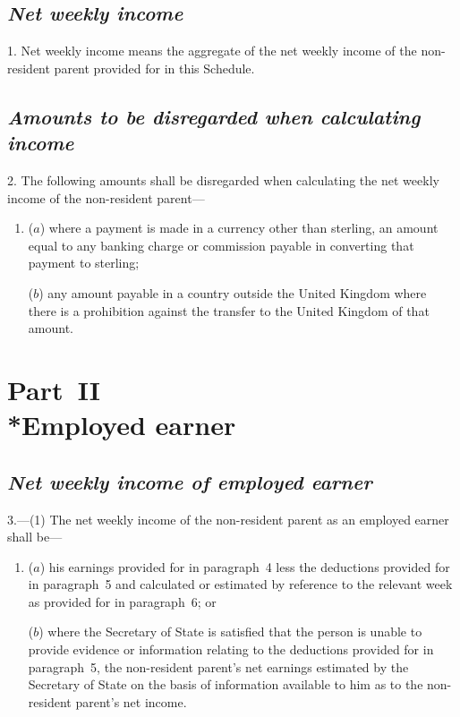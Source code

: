 \documentclass[12pt,a4paper]{article}
\begin{document}
\renewcommand\parthead{--- Schedule~Part~I}

\subsection*{\itshape Net weekly income}

1.  Net weekly income means the aggregate of the net weekly income of the non-resident parent provided for in this Schedule.

\subsection*{\itshape Amounts to be disregarded when calculating income}

2.  The following amounts shall be disregarded when calculating the net weekly income of the non-resident parent—
\begin{enumerate}\item[]
($a$) where a payment is made in a currency other than sterling, an amount equal to any banking charge or commission payable in converting that payment to sterling;

($b$) any amount payable in a country outside the United Kingdom where there is a prohibition against the transfer to the United Kingdom of that amount.
\end{enumerate}

\vfill

\section[Part~II --- Employed earner]{Part~II\\*Employed earner}

\renewcommand\parthead{--- Schedule~Part~II}

\subsection*{\itshape Net weekly income of employed earner}

3.---(1)  The net weekly income of the non-resident parent as an employed earner shall be—
\begin{enumerate}\item[]
($a$) his earnings provided for in paragraph~4 less the deductions provided for in paragraph~5 and calculated or estimated by reference to the relevant week as provided for in paragraph~6; or

($b$) where the Secretary of State is satisfied that the person is unable to provide evidence or information relating to the deductions provided for in paragraph~5, the non-resident parent’s net earnings estimated by the Secretary of State on the basis of information available to him as to the non-resident parent’s net income.
\end{enumerate}
\end{document}
